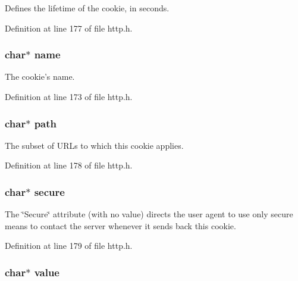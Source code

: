 Defines the lifetime of the cookie, in seconds. 



Definition at line 177 of file http.h.

\hypertarget{structorion__cookie_a5ac083a645d964373f022d03df4849c8}{
\subsubsection[{name}]{\setlength{\rightskip}{0pt plus 5cm}char$\ast$ {\bf name}}}
\label{structorion__cookie_a5ac083a645d964373f022d03df4849c8}


The cookie's name. 



Definition at line 173 of file http.h.

\hypertarget{structorion__cookie_a44196e6a5696d10442c29e639437196e}{
\subsubsection[{path}]{\setlength{\rightskip}{0pt plus 5cm}char$\ast$ {\bf path}}}
\label{structorion__cookie_a44196e6a5696d10442c29e639437196e}


The subset of URLs to which this cookie applies. 



Definition at line 178 of file http.h.

\hypertarget{structorion__cookie_aec238fb4192e50d4e96e474531c99f1b}{
\subsubsection[{secure}]{\setlength{\rightskip}{0pt plus 5cm}char$\ast$ {\bf secure}}}
\label{structorion__cookie_aec238fb4192e50d4e96e474531c99f1b}


The \char`\"{}Secure\char`\"{} attribute (with no value) directs the user agent to use only secure means to contact the server whenever it sends back this cookie. 



Definition at line 179 of file http.h.

\hypertarget{structorion__cookie_a4e9aec275e566b978a3ccb4e043d8c61}{
\subsubsection[{value}]{\setlength{\rightskip}{0pt plus 5cm}char$\ast$ {\bf value}}}
\label{structorion__cookie_a4e9aec275e566b978a3ccb4e043d8c61}


